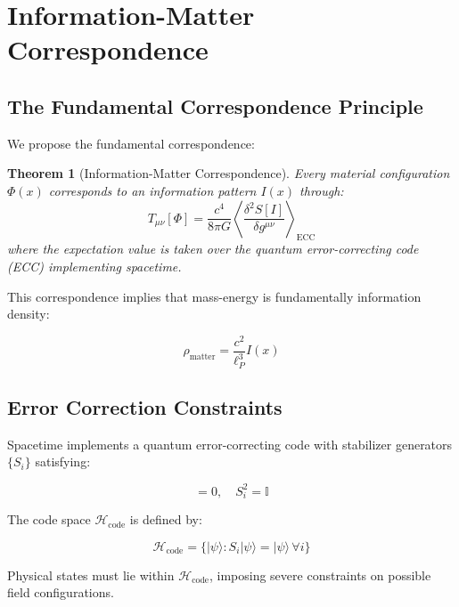 \documentclass[12pt,a4paper]{article}
\newtheorem{theorem}{Theorem}[section]
\begin{document}
\section{Information-Matter Correspondence}

\subsection{The Fundamental Correspondence Principle}

We propose the fundamental correspondence:

\begin{theorem}[Information-Matter Correspondence]
Every material configuration $\Phi(x)$ corresponds to an information pattern $I(x)$ through:
\begin{equation}
T_{\mu\nu}[\Phi] = \frac{c^4}{8\pi G} \left\langle \frac{\delta^2 S[I]}{\delta g^{\mu\nu}} \right\rangle_{\text{ECC}}
\end{equation}
where the expectation value is taken over the quantum error-correcting code (ECC) implementing spacetime.
\end{theorem}

This correspondence implies that mass-energy is fundamentally information density:

\begin{equation}
\rho_{\text{matter}} = \frac{c^2}{\ell_P^3} I(x)
\end{equation}

\subsection{Error Correction Constraints}

Spacetime implements a quantum error-correcting code with stabilizer generators $\{S_i\}$ satisfying:

\begin{equation}
[S_i, S_j] = 0, \quad S_i^2 = \mathbb{I}
\end{equation}

The code space $\mathcal{H}_{\text{code}}$ is defined by:

\begin{equation}
\mathcal{H}_{\text{code}} = \{|\psi\rangle : S_i|\psi\rangle = |\psi\rangle \, \forall i\}
\end{equation}

Physical states must lie within $\mathcal{H}_{\text{code}}$, imposing severe constraints on possible field configurations.
\end{document}
